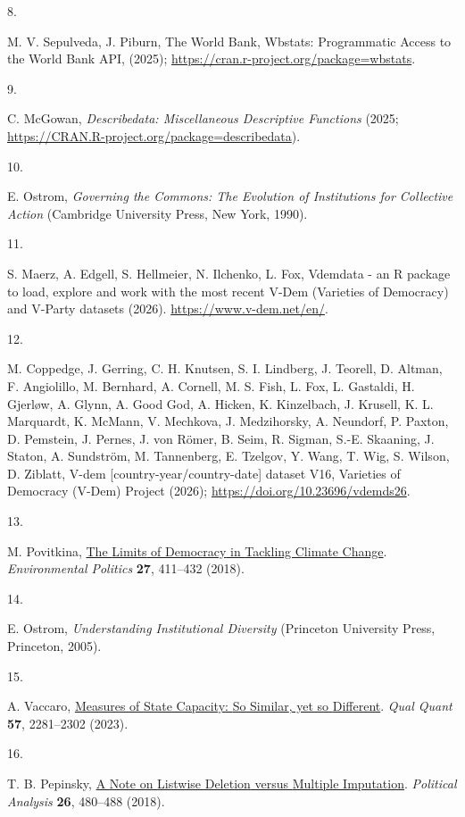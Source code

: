 \documentclass[
  12pt,
  letterpaper,
]{article}
\newlength{\cslhangindent}
\newlength{\csllabelwidth}
\newenvironment{CSLReferences}[2] %
 {\begin{list}{}{%
  \setlength{\itemindent}{0pt}
  \setlength{\leftmargin}{0pt}
  \setlength{\parsep}{0pt}
  \ifodd #1
   \setlength{\leftmargin}{\cslhangindent}
   \setlength{\itemindent}{-1\cslhangindent}
  \fi
  \setlength{\itemsep}{#2\baselineskip}}}
 {\end{list}}
\newcommand{\CSLLeftMargin}[1]{\parbox[t]{\csllabelwidth}{\strut#1\strut}}
\newcommand{\CSLRightInline}[1]{\parbox[t]{\linewidth - \csllabelwidth}{\strut#1\strut}}
\begin{document}
\begin{CSLReferences}{0}{1}
\CSLLeftMargin{8. }%
\CSLRightInline{M. V. Sepulveda, J. Piburn, The World Bank, Wbstats:
{Programmatic Access} to the {World Bank API}, (2025);
\url{https://cran.r-project.org/package=wbstats}.}

\CSLLeftMargin{9. }%
\CSLRightInline{C. McGowan, \emph{Describedata: {Miscellaneous
Descriptive Functions}} (2025;
\url{https://CRAN.R-project.org/package=describedata}).}

\CSLLeftMargin{10. }%
\CSLRightInline{E. Ostrom, \emph{Governing the {Commons}: {The
Evolution} of {Institutions} for {Collective Action}} (Cambridge
University Press, New York, 1990).}

\CSLLeftMargin{11. }%
\CSLRightInline{S. Maerz, A. Edgell, S. Hellmeier, N. Ilchenko, L. Fox,
Vdemdata - an {R} package to load, explore and work with the most recent
{V-Dem} ({Varieties} of {Democracy}) and {V-Party} datasets (2026).
\url{https://www.v-dem.net/en/}.}

\CSLLeftMargin{12. }%
\CSLRightInline{M. Coppedge, J. Gerring, C. H. Knutsen, S. I. Lindberg,
J. Teorell, D. Altman, F. Angiolillo, M. Bernhard, A. Cornell, M. S.
Fish, L. Fox, L. Gastaldi, H. Gjerløw, A. Glynn, A. Good God, A. Hicken,
K. Kinzelbach, J. Krusell, K. L. Marquardt, K. McMann, V. Mechkova, J.
Medzihorsky, A. Neundorf, P. Paxton, D. Pemstein, J. Pernes, J. von
Römer, B. Seim, R. Sigman, S.-E. Skaaning, J. Staton, A. Sundström, M.
Tannenberg, E. Tzelgov, Y. Wang, T. Wig, S. Wilson, D. Ziblatt, V-dem
{[}country-year/country-date{]} dataset V16, Varieties of Democracy
(V-Dem) Project (2026); \url{https://doi.org/10.23696/vdemds26}.}

\CSLLeftMargin{13. }%
\CSLRightInline{M. Povitkina,
\href{https://doi.org/10.1080/09644016.2018.1444723}{The {Limits} of
{Democracy} in {Tackling Climate Change}}. \emph{Environmental Politics}
\textbf{27}, 411--432 (2018).}

\CSLLeftMargin{14. }%
\CSLRightInline{E. Ostrom, \emph{Understanding {Institutional
Diversity}} (Princeton University Press, Princeton, 2005).}

\CSLLeftMargin{15. }%
\CSLRightInline{A. Vaccaro,
\href{https://doi.org/10.1007/s11135-022-01466-x}{Measures of {State
Capacity}: {So Similar}, yet so {Different}}. \emph{Qual Quant}
\textbf{57}, 2281--2302 (2023).}

\CSLLeftMargin{16. }%
\CSLRightInline{T. B. Pepinsky,
\href{https://doi.org/10.1017/pan.2018.18}{A {Note} on {Listwise
Deletion} versus {Multiple Imputation}}. \emph{Political Analysis}
\textbf{26}, 480--488 (2018).}

\end{CSLReferences}
\end{document}
